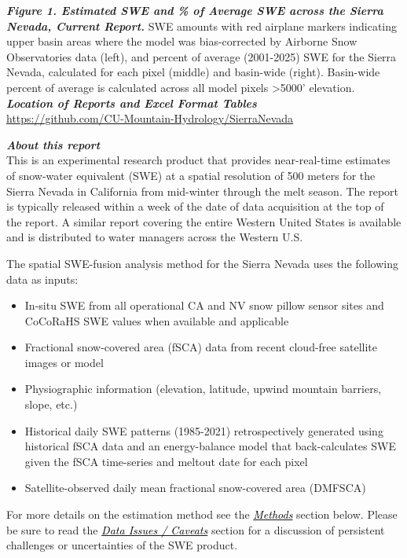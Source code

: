 \documentclass{article}
\begin{document}
\noindent\textbf{\textit{Figure 1. Estimated SWE and \% of Average SWE across the Sierra Nevada, Current Report.}} SWE amounts with red airplane markers indicating upper basin areas where the model was bias-corrected by Airborne Snow Observatories data (left), and percent of average (2001-2025) SWE for the Sierra Nevada, calculated for each pixel (middle) and basin-wide (right). Basin-wide percent of average is calculated across all model pixels >5000’ elevation.\\

\noindent\textbf{\textit{Location of Reports and Excel Format Tables}}\\
\href{https://github.com/CU-Mountain-Hydrology/SierraNevada}{\underline{https://github.com/CU-Mountain-Hydrology/SierraNevada}}

\newpage
\noindent\textbf{\textit{About this report}}\\
This is an experimental research product that provides near-real-time estimates of snow-water equivalent (SWE) at a spatial resolution of 500 meters for the Sierra Nevada in California from mid-winter through the melt season. The report is typically released within a week of the date of data acquisition at the top of the report. A similar report covering the entire Western United States is available and is distributed to water managers across the Western U.S.

\noindent The spatial SWE-fusion analysis method for the Sierra Nevada uses the following data as inputs:
\begin{itemize}
    \item[-] In-situ SWE from all operational CA and NV snow pillow sensor sites and CoCoRaHS SWE values when available and applicable
    \item[-] Fractional snow-covered area (fSCA) data from recent cloud-free satellite images or model
    \item[-] Physiographic information (elevation, latitude, upwind mountain barriers, slope, etc.)
    \item[-] Historical daily SWE patterns (1985-2021) retrospectively generated using historical fSCA data and an energy-balance model that back-calculates SWE given the fSCA time-series and meltout date for each pixel
    \item[-] Satellite-observed daily mean fractional snow-covered area (DMFSCA)
\end{itemize}

\noindent For more details on the estimation method see the \hyperref[sec:methods]{\textit{\textcolor{black}{Methods}}} section below. Please be sure to read the \hyperref[sec:data_issues]{\textit{\textcolor{black}{Data Issues / Caveats}}} section for a discussion of persistent challenges or uncertainties of the SWE product.\\
\end{document}

